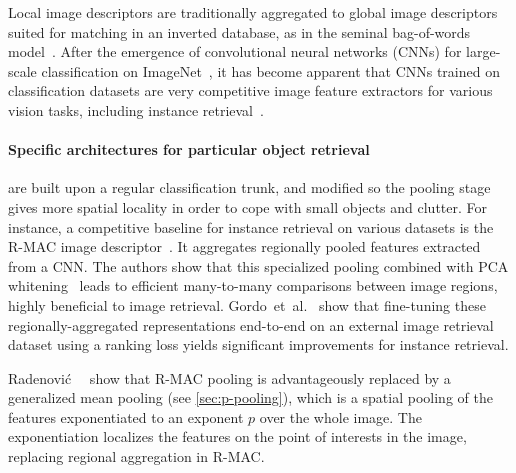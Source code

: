 %

Local image descriptors are traditionally aggregated to global image descriptors suited for matching in an inverted database, as in the seminal bag-of-words model~\cite{Sivic2003VideoGA}.
After the emergence of convolutional neural networks (CNNs) for large-scale classification on ImageNet~\cite{krizhevsky2012imagenet, ILSVRC15}, it has become apparent that CNNs trained on classification datasets are very competitive image feature extractors for various vision tasks, including instance retrieval~\cite{babenko2014neural,gong2014multi,Razavian2014CNNFO}. 



%
%
\paragraph{Specific architectures for particular object retrieval}\hspace{-1em} are built upon a regular classification trunk, and modified so the pooling stage gives more spatial locality in order to cope with small objects and clutter. 
%
%
%
For instance, a competitive baseline for instance retrieval on various datasets is the R-MAC image descriptor~\cite{Tolias2015ParticularOR}. It aggregates regionally pooled features extracted from a CNN. %
The authors show that this specialized pooling combined with PCA whitening~\cite{jegou2012negative} leads to efficient many-to-many comparisons between image regions, highly beneficial to image retrieval.
%
Gordo~et~al.~\cite{Gordo2016DeepIR, Gordo2017EndtoEndLO} show that fine-tuning these regionally-aggregated representations end-to-end on an external image retrieval dataset using a ranking loss yields significant improvements for instance retrieval. 

Radenovi{\'c}~\etal~\cite{radenovic2018fine} show that R-MAC pooling is advantageously replaced by a generalized mean pooling (see \cref{sec:p-pooling}), which is a spatial pooling of the features exponentiated to an exponent $p$ over the whole image. The exponentiation localizes the features on the point of interests in the image, replacing regional aggregation in R-MAC. %

